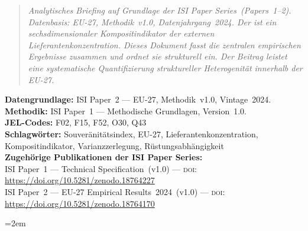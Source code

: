 \documentclass[12pt,a4paper]{article}
\begin{document}
\hypersetup{pageanchor=false}


\vspace*{-2.65cm}
\begin{abstract}
\small\noindent
\textit{Analytisches Briefing auf Grundlage der ISI Paper
Series~(Papers~1--2).  Datenbasis: EU-27, Methodik~v1.0,
Datenjahrgang~2024.  Der \ISI ist ein sechs\-dimensionaler
Kompositindikator der externen Lieferanten\-konzentration.
Dieses Dokument fasst die zentralen empirischen Ergebnisse
zusammen und ordnet sie strukturell ein.  Der Beitrag leistet
eine systematische Quantifizierung struktureller
Heterogenit\"at innerhalb der EU-27.}
\end{abstract}
\vspace{0.05cm}
{\footnotesize
\noindent\textbf{Datengrundlage:} ISI Paper~2 --- EU-27,
Methodik~v1.0, Vintage~2024.\\[0.02cm]
\noindent\textbf{Methodik:} ISI Paper~1 --- Methodische
Grundlagen, Version~1.0.\\[0.02cm]
\noindent\textbf{JEL-Codes:} F02, F15, F52, O30, Q43\\[0.02cm]
\noindent\textbf{Schlagw\"orter:} Souver\"anit\"atsindex, EU-27,
Lieferantenkonzentration, Kompositindikator, Varianzzerlegung,
R\"ustungsabh\"angigkeit\\[0.08cm]
\noindent\textbf{Zugeh\"orige Publikationen der ISI Paper Series:}\\[0.02cm]
\noindent ISI Paper~1 --- Technical Specification~(v1.0) ---
\textsc{doi}: \url{https://doi.org/10.5281/zenodo.18764227}\\[0.01cm]
\noindent ISI Paper~2 --- EU-27 Empirical Results~2024~(v1.0) ---
\textsc{doi}: \url{https://doi.org/10.5281/zenodo.18764170}\par}
\isiendtitlepage
\hypersetup{pageanchor=true}



\begingroup\emergencystretch=2em

\endgroup
\end{document}
